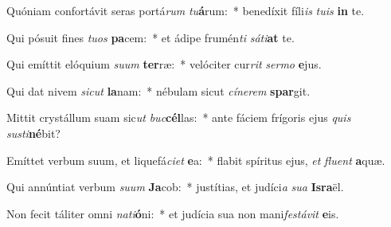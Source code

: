 \item Quóniam confortávit seras portá\textit{rum} \textit{tu}\textbf{á}rum:~* benedíxit fíli\textit{is} \textit{tu}\textit{is} \textbf{in} te.
\item Qui pósuit fines \textit{tu}\textit{os} \textbf{pa}cem:~* et ádipe frumén\textit{ti} \textit{sá}\textit{ti}\textbf{at} te.
\item Qui emíttit elóquium \textit{su}\textit{um} \textbf{ter}ræ:~* velóciter cur\textit{rit} \textit{ser}\textit{mo} \textbf{e}jus.
\item Qui dat nivem \textit{sic}\textit{ut} \textbf{la}nam:~* nébulam sicut \textit{cí}\textit{ne}\textit{rem} \textbf{spar}git.
\item Mittit crystállum suam sic\textit{ut} \textit{buc}\textbf{cél}las:~* ante fáciem frígoris ejus \textit{quis} \textit{sus}\textit{ti}\textbf{né}bit?
\item Emíttet verbum suum, et liquefá\textit{ci}\textit{et} \textbf{e}a:~* flabit spíritus ejus, \textit{et} \textit{flu}\textit{ent} \textbf{a}quæ.
\item Qui annúntiat verbum \textit{su}\textit{um} \textbf{Ja}cob:~* justítias, et judíci\textit{a} \textit{su}\textit{a} \textbf{Is}\textbf{ra}ël.
\item Non fecit táliter omni \textit{na}\textit{ti}\textbf{ó}ni:~* et judícia sua non mani\textit{fes}\textit{tá}\textit{vit} \textbf{e}is.
